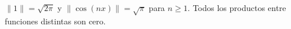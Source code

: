 $\|1\|=\sqrt{2\pi}$ y $\|\cos(nx)\|=\sqrt\pi$ para $n\ge1$. Todos los productos entre funciones distintas son cero.
